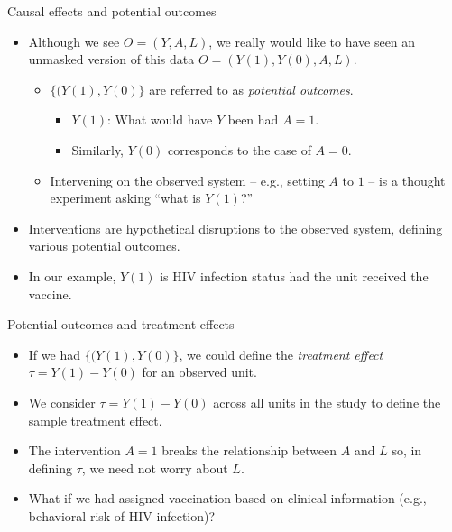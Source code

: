 \documentclass[ignorenonframetext,]{beamer}
\providecommand{\tightlist}{%
  \setlength{\itemsep}{0pt}\setlength{\parskip}{0pt}}
\begin{document}
\begin{frame}{Causal effects and potential outcomes}
\protect\hypertarget{causal-effects-and-potential-outcomes}{}

\begin{itemize}[<+->]
\tightlist
\item
  Although we see \(O = (Y, A, L)\), we really would like to have seen
  an unmasked version of this data \(O = (Y(1), Y(0), A, L)\).

  \begin{itemize}[<+->]
  \tightlist
  \item
    \(\{(Y(1), Y(0)\}\) are referred to as \emph{potential outcomes}.

    \begin{itemize}[<+->]
    \tightlist
    \item
      \(Y(1)\): What would have \(Y\) been had \(A = 1\).
    \item
      Similarly, \(Y(0)\) corresponds to the case of \(A = 0\).
    \end{itemize}
  \item
    Intervening on the observed system -- e.g., setting \(A\) to \(1\)
    -- is a thought experiment asking ``what is \(Y(1)\)?''
  \end{itemize}
\item
  Interventions are hypothetical disruptions to the observed system,
  defining various potential outcomes.
\item
  In our example, \(Y(1)\) is HIV infection status had the unit received
  the vaccine.
\end{itemize}

\end{frame}

\begin{frame}{Potential outcomes and treatment effects}
\protect\hypertarget{potential-outcomes-and-treatment-effects}{}

\begin{itemize}[<+->]
\tightlist
\item
  If we had \(\{(Y(1), Y(0)\}\), we could define the \emph{treatment
  effect} \(\tau = Y(1) - Y(0)\) for an observed unit.
\item
  We consider \(\tau = Y(1) - Y(0)\) across all units in the study to
  define the sample treatment effect.
\item
  The intervention \(A = 1\) breaks the relationship between \(A\) and
  \(L\) so, in defining \(\tau\), we need not worry about \(L\).
\item
  What if we had assigned vaccination based on clinical information
  (e.g., behavioral risk of HIV infection)?
\end{itemize}

\end{frame}
\end{document}
